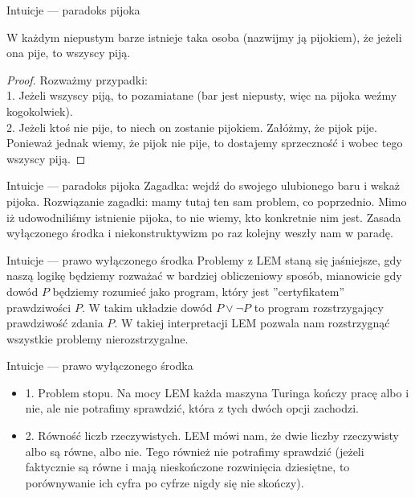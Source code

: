 \documentclass{beamer}
\begin{document}
\begin{frame}{Intuicje — paradoks pijoka}
\begin{theorem}
W każdym niepustym barze istnieje taka osoba (nazwijmy ją pijokiem), że jeżeli ona pije, to wszyscy piją.
\end{theorem}
\begin{proof}
Rozważmy przypadki: \\
1. Jeżeli wszyscy piją, to pozamiatane (bar jest niepusty, więc na pijoka weźmy kogokolwiek). \\
2. Jeżeli ktoś nie pije, to niech on zostanie pijokiem. Załóżmy, że pijok pije. Ponieważ jednak wiemy, że pijok nie pije, to dostajemy sprzeczność i wobec tego wszyscy piją.
\end{proof}
\end{frame}

\begin{frame}{Intuicje — paradoks pijoka}
Zagadka: wejdź do swojego ulubionego baru i wskaż pijoka.
Rozwiązanie zagadki: mamy tutaj ten sam problem, co poprzednio. Mimo iż udowodniliśmy istnienie pijoka, to nie wiemy, kto konkretnie nim jest. Zasada wyłączonego środka i niekonstruktywizm po raz kolejny weszły nam w paradę.
\end{frame}

\begin{frame}{Intuicje — prawo wyłączonego środka}
Problemy z LEM staną się jaśniejsze, gdy naszą logikę będziemy rozważać w bardziej obliczeniowy sposób, mianowicie gdy dowód $P$ będziemy rozumieć jako program, który jest ''certyfikatem'' prawdziwości $P$. W takim układzie dowód $P \lor \neg P$ to program rozstrzygający prawdziwość zdania $P$. W takiej interpretacji LEM pozwala nam rozstrzygnąć wszystkie problemy nierozstrzygalne.
\end{frame}

\begin{frame}{Intuicje — prawo wyłączonego środka}
\begin{itemize}
	\item 1. Problem stopu. Na mocy LEM każda maszyna Turinga kończy pracę albo i nie, ale nie potrafimy sprawdzić, która z tych dwóch opcji zachodzi.
	\item 2. Równość liczb rzeczywistych. LEM mówi nam, że dwie liczby rzeczywisty albo są równe, albo nie. Tego również nie potrafimy sprawdzić (jeżeli faktycznie są równe i mają nieskończone rozwinięcia dziesiętne, to porównywanie ich cyfra po cyfrze nigdy się nie skończy).
\end{itemize}
\end{frame}
\end{document}
